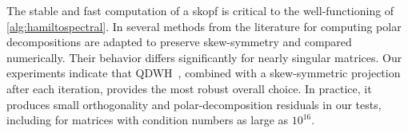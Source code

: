 \documentclass[final,onefignum,onetabnum,dvipsnames]{siamart251216}
\numberwithin{algorithm}{section}
\numberwithin{equation}{section}
\newcommand{\vmark}{\textcolor{Green}{\ding{51}}}%
\newcommand{\xmark}{\textcolor{Red}{\ding{55}}}%
\begin{document}
The stable and fast computation of a skopf is critical to the well-functioning of \cref{alg:hamiltospectral}. In  several methods from the literature for computing polar decompositions are adapted to preserve skew-symmetry and compared numerically. Their behavior differs significantly for nearly singular matrices. Our experiments indicate that QDWH~\cite{NakatsukasaBaiGygi2010}, combined with a skew-symmetric projection after each iteration, provides the most robust overall choice. In practice, it produces
small orthogonality and polar-decomposition residuals in our tests,
including for matrices with condition numbers as large as $10^{16}$.

\end{document}

